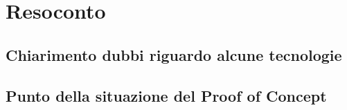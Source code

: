 \section{Resoconto}
\subsection{Chiarimento dubbi riguardo alcune tecnologie}
\subsection{Punto della situazione del Proof of Concept}


